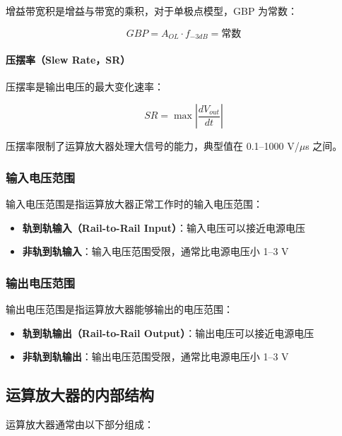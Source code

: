 增益带宽积是增益与带宽的乘积，对于单极点模型，GBP 为常数：

\begin{equation}
GBP = A_{OL} \cdot f_{-3dB} = \text{常数} \label{eq:gain-bandwidth-product}
\end{equation}

\paragraph{压摆率（Slew Rate，SR）}

压摆率是输出电压的最大变化速率：

\begin{equation}
SR = \max\left|\frac{dV_{out}}{dt}\right| \label{eq:slew-rate}
\end{equation}

压摆率限制了运算放大器处理大信号的能力，典型值在 0.1--1000 V/$\mu$s 之间。

\subsubsection{输入电压范围}

输入电压范围是指运算放大器正常工作时的输入电压范围：
\begin{itemize}
  \item \textbf{轨到轨输入（Rail-to-Rail Input）}：输入电压可以接近电源电压
  \item \textbf{非轨到轨输入}：输入电压范围受限，通常比电源电压小 1--3 V
\end{itemize}

\subsubsection{输出电压范围}

输出电压范围是指运算放大器能够输出的电压范围：
\begin{itemize}
  \item \textbf{轨到轨输出（Rail-to-Rail Output）}：输出电压可以接近电源电压
  \item \textbf{非轨到轨输出}：输出电压范围受限，通常比电源电压小 1--3 V
\end{itemize}

\subsection{运算放大器的内部结构}

运算放大器通常由以下部分组成：

